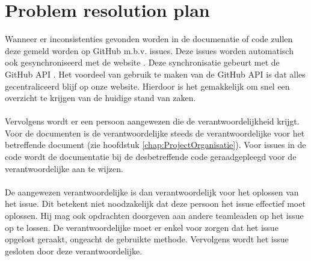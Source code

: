 \section{Problem resolution plan} \label{sec:ProblemResolutionPlan}
Wanneer er inconsistenties gevonden worden in de documenatie of code zullen deze gemeld worden op GitHub m.b.v. issues. Deze issues worden automatisch ook gesynchroniseerd met de website \cite{portalWebsite}. Deze synchronisatie gebeurt met de GitHub API \cite{GitHubAPI}. Het voordeel van gebruik te maken van de GitHub API is dat alles gecentraliceerd blijf op onze website. Hierdoor is het gemakkelijk om snel een overzicht te krijgen van de huidige stand van zaken. 
\\
\\
Vervolgens wordt er een persoon aangewezen die de verantwoordelijkheid krijgt. Voor de documenten is de verantwoordelijke steeds de verantwoordelijke voor het betreffende document (zie hoofdstuk \ref{chap:ProjectOrganisatie}). Voor issues in de code wordt de documentatie bij de desbetreffende code geraadgepleegd voor de verantwoordelijke aan te wijzen.
\\
\\
De aangewezen verantwoordelijke is dan verantwoordelijk voor het oplossen van het issue. Dit betekent niet noodzakelijk dat deze persoon het issue effectief moet oplossen. Hij mag ook opdrachten doorgeven aan andere teamleaden op het issue op te lossen. De verantwoordelijke moet er enkel voor zorgen dat het issue opgelost geraakt, ongeacht de gebruikte methode. Vervolgens wordt het issue gesloten door deze verantwoordelijke.

